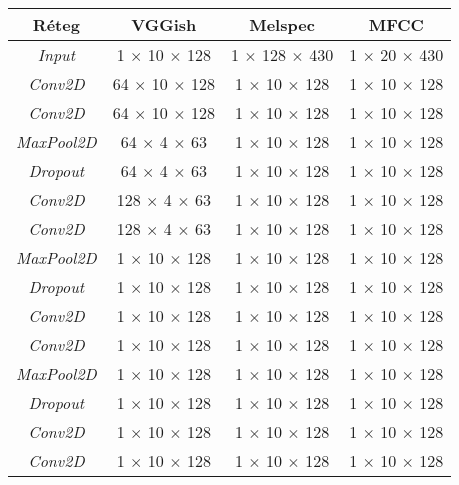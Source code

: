 \begin{table}[H]
	\centering
	\begin{tabular}{ | c | c |  c | c |}
		\hline
		\textbf{Réteg} & \textbf{VGGish} & \textbf{Melspec}& \textbf{MFCC}  \\
		\hline \hline
		\emph{Input} & 1 $\times$ 10 $\times$ 128 & 1 $\times$ 128 $\times$ 430 & 1 $\times$ 20 $\times$ 430 \\
		\hline
		\emph{Conv2D} & 64 $\times$ 10 $\times$ 128 & 1 $\times$ 10 $\times$ 128 & 1 $\times$ 10 $\times$ 128 \\
		\hline
		\emph{Conv2D} & 64 $\times$ 10 $\times$ 128 & 1 $\times$ 10 $\times$ 128 & 1 $\times$ 10 $\times$ 128 \\
		\hline
		\emph{MaxPool2D} & 64 $\times$ 4 $\times$ 63 & 1 $\times$ 10 $\times$ 128 & 1 $\times$ 10 $\times$ 128 \\
		\hline
		\emph{Dropout} & 64 $\times$ 4 $\times$ 63 & 1 $\times$ 10 $\times$ 128 & 1 $\times$ 10 $\times$ 128 \\
		\hline 
		\emph{Conv2D} & 128 $\times$ 4 $\times$ 63 & 1 $\times$ 10 $\times$ 128 & 1 $\times$ 10 $\times$ 128 \\
		\hline
		\emph{Conv2D} & 128 $\times$ 4 $\times$ 63 & 1 $\times$ 10 $\times$ 128 & 1 $\times$ 10 $\times$ 128 \\
		\hline
		\emph{MaxPool2D} & 1 $\times$ 10 $\times$ 128 & 1 $\times$ 10 $\times$ 128 & 1 $\times$ 10 $\times$ 128 \\
		\hline
		\emph{Dropout} & 1 $\times$ 10 $\times$ 128 & 1 $\times$ 10 $\times$ 128 & 1 $\times$ 10 $\times$ 128 \\
		\hline 
		\emph{Conv2D} & 1 $\times$ 10 $\times$ 128 & 1 $\times$ 10 $\times$ 128 & 1 $\times$ 10 $\times$ 128 \\
		\hline
		\emph{Conv2D} & 1 $\times$ 10 $\times$ 128 & 1 $\times$ 10 $\times$ 128 & 1 $\times$ 10 $\times$ 128 \\
		\hline
		\emph{MaxPool2D} & 1 $\times$ 10 $\times$ 128 & 1 $\times$ 10 $\times$ 128 & 1 $\times$ 10 $\times$ 128 \\
		\hline
		\emph{Dropout} & 1 $\times$ 10 $\times$ 128 & 1 $\times$ 10 $\times$ 128 & 1 $\times$ 10 $\times$ 128 \\
		\hline 
		\emph{Conv2D} & 1 $\times$ 10 $\times$ 128 & 1 $\times$ 10 $\times$ 128 & 1 $\times$ 10 $\times$ 128 \\
		\hline
		\emph{Conv2D} & 1 $\times$ 10 $\times$ 128 & 1 $\times$ 10 $\times$ 128 & 1 $\times$ 10 $\times$ 128 \\

\end{tabular}
\end{table}

